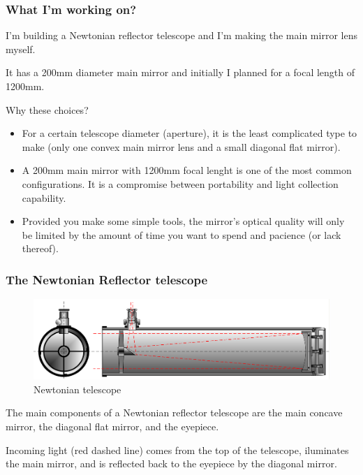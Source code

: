 \documentclass{beamer}
\begin{document}
\begin{frame}
\frametitle{What I'm working on?}
I'm building a Newtonian reflector telescope and I'm making the main mirror lens myself.

It has a 200mm diameter main mirror and initially I planned for a focal length of 1200mm.

Why these choices?
\begin{itemize}
\item For a certain telescope diameter (aperture), it is the least complicated type to make (only one convex main mirror lens and a small diagonal flat mirror).
\item A 200mm main mirror with 1200mm focal lenght is one of the most common configurations. It is a compromise between portability and light collection capability.
\item Provided you make some simple tools, the mirror's optical quality will only be limited by the amount of time you want to spend and pacience (or lack thereof).
\end{itemize}
\end{frame}

\begin{frame}
\frametitle{The Newtonian Reflector telescope}
\begin{figure}
\includegraphics[scale=0.4]{assets/Newtontelescope.png}
\caption{Newtonian telescope}
\end{figure}
The main components of a Newtonian reflector telescope are the main concave mirror\footnotemark,
the diagonal flat mirror, and the eyepiece\footnotemark.

Incoming light (red dashed line) comes from the top of the telescope, iluminates the main mirror, and is reflected back to the eyepiece by the diagonal mirror.
\end{frame}
\end{document}
